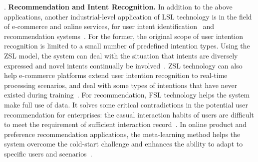 \uppercase\expandafter{}. \textbf{Recommendation and Intent Recognition.} In addition to the above applications, another industrial-level application of LSL technology is in the field of e-commerce and online services, for user intent identification~ and recommendation systems~. For the former, the original scope of user intention recognition is limited to a small number of predefined intention types. Using the ZSL model, the system can deal with the situation that intents are diversely expressed and novel intents continually be involved~.  ZSL technology can also help e-commerce platforms extend user intention recognition to real-time processing scenarios, and  deal with some types of intentions that have never existed during training~. For recommendation, FSL technology helps the system make full use of data. It solves some critical contradictions in the potential user recommendation for enterprises: the casual interaction habits of users are difficult to meet the requirement of sufficient interaction record~. In online product and preference recommendation applications, the meta-learning method helps the system overcome the cold-start challenge and enhances the ability to adapt to specific users and scenarios~.

